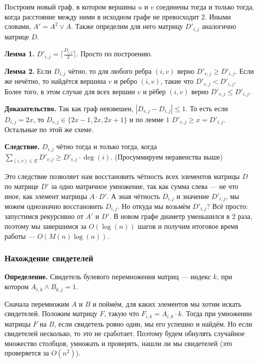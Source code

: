 Построим новый граф, в котором вершины $u$ и $v$ соединены тогда и только тогда, когда расстояние между ними в исходном графе не превосходит 2.
Иными словами, $A' = A^2 \vee A$.
Также определим для него матрицу $D'_{i,j}$ аналогично матрице $D$.

\textbf{Лемма 1.} $D'_{i,j} = \lceil \frac{D_{i,j}}{2} \rceil$.
Просто по построению.

\textbf{Лемма 2.} Если $D_{i,j}$ чётно, то для любого ребра $(i, v)$ верно $D'_{v,j} \ge D'_{i,j}$.
Если же нечётно, то найдётся вершина $v$ и ребро $(i, v)$, такие что $D'_{v,j} < D'_{i,j}$.
Более того, в этом случае для всех вершин $v$ и рёбер $(i, v)$ верно $D'_{v,j} \le D'_{i,j}$.

\textbf{Доказательство.} Так как граф невзвешен, $|D_{v,j} - D_{i,j}| \le 1$.
То есть если $D_{i,j} = 2x$, то $D_{v,j} \in \{2x - 1, 2x, 2x + 1\}$ и по лемме 1 $D'_{v,j} \ge x = D'_{i,j}$.
Остальные по этой же схеме.

\textbf{Следствие.} $D_{i,j}$ чётно тогда и только тогда, когда $\sum_{(i, v) \in E} D'_{v,j} \ge D'_{i,j} \cdot \deg(i)$.
(Просуммируем неравенства выше)

Это следствие позволяет нам восстановить чётность всех элементов матрицы $D$ по матрице $D'$ за одно матричное умножение, так как сумма слева --- не что иное, как элемент матрицы $A \cdot D'$.
А зная чётность $D_{i,j}$ и значение $D'_{i,j}$, мы можем однозначно восстановить $D_{i,j}$.
Но откуда мы возьмём $D'_{i,j}$? Всё просто: запустимся рекурсивно от $A'$ и $D'$.
В новом графе диаметр уменьшился в 2 раза, поэтому мы завершимся за $O(\log(n))$ шагов и получим итоговое время работы --- $O(M(n) \log(n))$.

\subsubsection{Нахождение свидетелей}
\textbf{Определение.} Свидетель булевого перемножения матриц --- индекс $k$, при котором $A_{i,k} \wedge B_{k,j} = 1$.

Сначала перемножим $A$ и $B$ и поймём, для каких элементов мы хотим искать свидетелей.
Положим матрицу $F$, такую что $F_{i,k} = A_{i,k} \cdot k$.
Тогда при умножении матрицы $F$ на $B$, если свидетель ровно один, мы его успешно и найдём.
Но если свидетелей несколько, то это не сработает.
Поэтому будем обнулять случайное множество столбцов, умножать и проверять, нашли ли мы свидетелей (это проверяется за $O(n^2)$).


